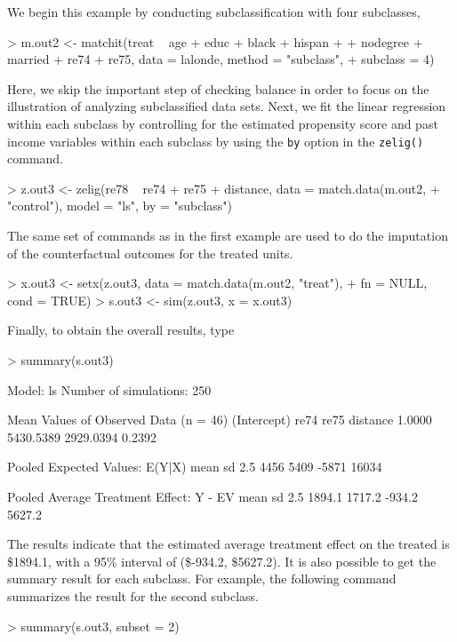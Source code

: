 \begin{enumerate}
  We begin this example by conducting subclassification with four subclasses,
\begin{Schunk}
\begin{Sinput}
> m.out2 <- matchit(treat ~ age + educ + black + hispan + 
+     nodegree + married + re74 + re75, data = lalonde, method = "subclass", 
+     subclass = 4)
\end{Sinput}
\end{Schunk}
Here, we skip the important step of checking balance in order to focus
on the illustration of analyzing subclassified data sets.  Next, we
fit the linear regression within each subclass by controlling for the
estimated propensity score and past income variables within each
subclass by using the {\tt by} option in the {\tt zelig()} command. 
\begin{Schunk}
\begin{Sinput}
> z.out3 <- zelig(re78 ~ re74 + re75 + distance, data = match.data(m.out2, 
+     "control"), model = "ls", by = "subclass")
\end{Sinput}
\end{Schunk}
The same set of commands as in the first example are used to
do the imputation of the counterfactual outcomes for the treated
units.
\begin{Schunk}
\begin{Sinput}
> x.out3 <- setx(z.out3, data = match.data(m.out2, "treat"), 
+     fn = NULL, cond = TRUE)
> s.out3 <- sim(z.out3, x = x.out3)
\end{Sinput}
\end{Schunk}
Finally, to obtain the overall results, type
\begin{Schunk}
\begin{Sinput}
> summary(s.out3)
\end{Sinput}
\begin{Soutput}

  Model: ls 
  Number of simulations: 250 

Mean Values of Observed Data (n = 46) 
(Intercept)        re74        re75    distance 
     1.0000   5430.5389   2929.0394      0.2392 

Pooled Expected Values: E(Y|X)
 mean    sd  2.5% 97.5% 
 4456  5409 -5871 16034 

Pooled Average Treatment Effect: Y - EV
  mean     sd   2.5%  97.5% 
1894.1 1717.2 -934.2 5627.2 

\end{Soutput}
\end{Schunk}
The results indicate that the estimated average treatment effect on
the treated is
\$1894.1,
with a 95\% interval of
(\$-934.2,
\$5627.2).
It is also possible to get the summary result for each subclass. For
example, the following command summarizes the result for the second
subclass.
\begin{Schunk}
\begin{Sinput}
> summary(s.out3, subset = 2)
\end{Sinput}
\begin{Soutput}


\end{Soutput}
\end{Schunk}
\end{enumerate}
